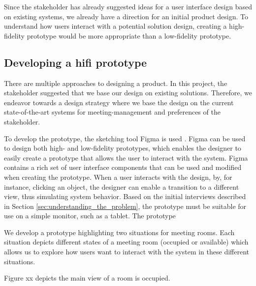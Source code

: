 Since the stakeholder has already suggested ideas for a user interface design based on existing systems, we already have a direction for an initial product design. 
To understand how users interact with a potential solution design, creating a high-fidelity prototype would be more appropriate than a low-fidelity prototype\cite{low-vs-high-fidelity-prototype}.

\subsection{Developing a hifi prototype}
There are multiple approaches to designing a product.
In this project, the stakeholder suggested that we base our design on existing solutions.
Therefore, we endeavor towards a design strategy where we base the design on the current state-of-the-art systems for meeting-management and preferences of the stakeholder.

To develop the prototype, the sketching tool Figma is used \cite{Figma}.
Figma can be used to design both high- and low-fidelity prototypes, which enables the designer to easily create a prototype that allows the user to interact with the system.
Figma contains a rich set of user interface components that can be used and modified when creating the prototype.
When a user interacts with the design, by, for instance, clicking an object, the designer can enable a transition to a different view, thus simulating system behavior. 
Based on the initial interviews described in Section \ref{sec:understanding_the_problem}, the prototype must be suitable for use on a simple monitor, such as a tablet.
The prototype 

We develop a prototype highlighting two situations for meeting rooms.
Each situation depicts different states of a meeting room (occupied or available) which allows us to explore how users want to interact with the system in these different situations. 

Figure xx depicts the main view of a room is occupied.
